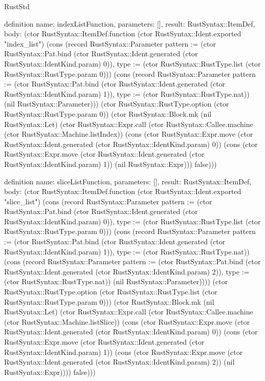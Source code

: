 \begin{lexlean}{RustStd}
\begin{semanticmodule}
definition{
  name: indexListFunction,
  parameters: [],
  result: RustSyntax::ItemDef,
  body: (ctor RustSyntax::ItemDef.function (ctor RustSyntax::Ident.exported "index_list") (cons (record RustSyntax::Parameter {pattern := (ctor RustSyntax::Pat.bind (ctor RustSyntax::Ident.generated (ctor RustSyntax::IdentKind.param) 0)), type := (ctor RustSyntax::RustType.list (ctor RustSyntax::RustType.param 0))}) (cons (record RustSyntax::Parameter {pattern := (ctor RustSyntax::Pat.bind (ctor RustSyntax::Ident.generated (ctor RustSyntax::IdentKind.param) 1)), type := (ctor RustSyntax::RustType.nat)}) (nil RustSyntax::Parameter))) (ctor RustSyntax::RustType.option (ctor RustSyntax::RustType.param 0)) (ctor RustSyntax::Block.mk (nil RustSyntax::Let) (ctor RustSyntax::Expr.call (ctor RustSyntax::Callee.machine (ctor RustSyntax::Machine.listIndex)) (cons (ctor RustSyntax::Expr.move (ctor RustSyntax::Ident.generated (ctor RustSyntax::IdentKind.param) 0)) (cons (ctor RustSyntax::Expr.move (ctor RustSyntax::Ident.generated (ctor RustSyntax::IdentKind.param) 1)) (nil RustSyntax::Expr))) false)))
}

definition{
  name: sliceListFunction,
  parameters: [],
  result: RustSyntax::ItemDef,
  body: (ctor RustSyntax::ItemDef.function (ctor RustSyntax::Ident.exported "slice_list") (cons (record RustSyntax::Parameter {pattern := (ctor RustSyntax::Pat.bind (ctor RustSyntax::Ident.generated (ctor RustSyntax::IdentKind.param) 0)), type := (ctor RustSyntax::RustType.list (ctor RustSyntax::RustType.param 0))}) (cons (record RustSyntax::Parameter {pattern := (ctor RustSyntax::Pat.bind (ctor RustSyntax::Ident.generated (ctor RustSyntax::IdentKind.param) 1)), type := (ctor RustSyntax::RustType.nat)}) (cons (record RustSyntax::Parameter {pattern := (ctor RustSyntax::Pat.bind (ctor RustSyntax::Ident.generated (ctor RustSyntax::IdentKind.param) 2)), type := (ctor RustSyntax::RustType.nat)}) (nil RustSyntax::Parameter)))) (ctor RustSyntax::RustType.option (ctor RustSyntax::RustType.list (ctor RustSyntax::RustType.param 0))) (ctor RustSyntax::Block.mk (nil RustSyntax::Let) (ctor RustSyntax::Expr.call (ctor RustSyntax::Callee.machine (ctor RustSyntax::Machine.listSlice)) (cons (ctor RustSyntax::Expr.move (ctor RustSyntax::Ident.generated (ctor RustSyntax::IdentKind.param) 0)) (cons (ctor RustSyntax::Expr.move (ctor RustSyntax::Ident.generated (ctor RustSyntax::IdentKind.param) 1)) (cons (ctor RustSyntax::Expr.move (ctor RustSyntax::Ident.generated (ctor RustSyntax::IdentKind.param) 2)) (nil RustSyntax::Expr)))) false)))
}


\end{semanticmodule}
\end{lexlean}
